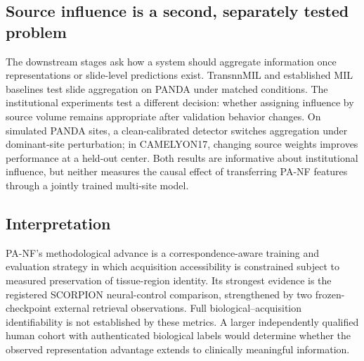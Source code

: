 \subsection{Source influence is a second, separately tested problem}
The downstream stages ask how a system should aggregate information once representations or slide-level predictions exist. TransnnMIL and established MIL baselines test slide aggregation on PANDA under matched conditions. The institutional experiments test a different decision: whether assigning influence by source volume remains appropriate after validation behavior changes. On simulated PANDA sites, a clean-calibrated detector switches aggregation under dominant-site perturbation; in CAMELYON17, changing source weights improves performance at a held-out center. Both results are informative about institutional influence, but neither measures the causal effect of transferring PA-NF features through a jointly trained multi-site model.

\subsection{Interpretation}
PA-NF's methodological advance is a correspondence-aware training and evaluation strategy in which acquisition accessibility is constrained subject to measured preservation of tissue-region identity. Its strongest evidence is the registered SCORPION neural-control comparison, strengthened by two frozen-checkpoint external retrieval observations. Full biological--acquisition identifiability is not established by these metrics. A larger independently qualified human cohort with authenticated biological labels would determine whether the observed representation advantage extends to clinically meaningful information.
